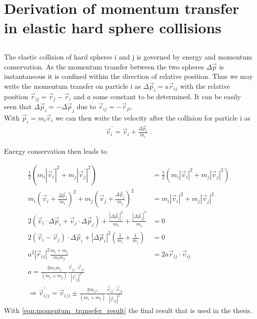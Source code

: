 
\label{sec:appendix}
\chapter{Derivation of momentum transfer in elastic hard sphere collisions}
\section*{}
The elastic collision of hard spheres i and j is governed by energy and momentum conservation. As the momentum transfer between the two spheres $\Delta \vec{p}$ is instantaneous it is confined within the direction of relative position. Thus we may write the momentum transfer on particle i as $\Delta \vec{p}_i = a \vec{r}_{ij}$ with the relative position $\vec{r}_{ij} = \vec{r}_{j} -\vec{r}_{i} $ and $a$ some constant to be determined. It can be easily seen that $\Delta \vec{p}_i = - \Delta \vec{p}_j$ due to $\vec{r}_{ij} = -\vec{r}_{ji}$. \\

With $\vec{p}_i = m_i \vec{v}_i$ we can then write the velocity after the collision for particle i as
\begin{align}
\vec{v}_i^{\,'} = \vec{v}_i +\frac{\Delta \vec{p}_i } {m_i} \; \text{.}
\end{align}

Energy conservation then leads to

\begin{align}
\label{eqn:momentum_transfer}
\frac{1}{2}\left( m_i |\vec{v}_i^{\,'}|^2 + m_j |\vec{v}_j^{\,'}|^2 \right) &= \frac{1}{2}\left( m_i |\vec{v}_i|^2 + m_j |\vec{v}_j|^2 \right)\\
 m_i \left(  \vec{v}_i +\frac{\Delta \vec{p}_i } {m_i} \right)^2 + m_ j\left(  \vec{v}_j +\frac{\Delta \vec{p}_j } {m_j} \right)^2  &= m_i |\vec{v}_i|^2 + m_j |\vec{v}_j|^2 \\
2 \left(  \vec{v}_i \cdot  \Delta \vec{p}_i  +\vec{v}_j \cdot  \Delta \vec{p}_j   \right)+\frac{|\Delta \vec{p}_i|^2 } {m_i} +\frac{|\Delta \vec{p}_j|^2 } {m_j} &= 0\\
2 (\vec{v}_i - \vec{v}_j)\cdot \Delta \vec{p}_i + |\Delta \vec{p}_i|^2 \left(\frac{1}{m_i} +\frac{1}{m_j} \right) &=0\\
a^2 |\vec{r}_{ij}|^2 \frac{m_i + m_j}{m_i m_j} &= 2 a \vec{r}_{ij} \cdot \vec{v}_{ij} \\
a = \frac{2 m_i m_j }{(m_i + m_j)  } \frac{\vec{r}_{ij} \cdot \vec{v}_{ij}}{|\vec{r}_{ij}|^2}\\
\label{eqn:momentum_transefer_result}
\Rightarrow \vec{v}_{i/j}^{\,'} = \vec{v}_{i/j} \pm \frac{2 m_{j/i} }{(m_i + m_j)  } \frac{\vec{r}_{ij} \cdot \vec{v}_{ij}}{|\vec{r}_{ij}|^2}
\end{align}
With \autoref{eqn:momentum_transefer_result} the final result that is used in the thesis.
